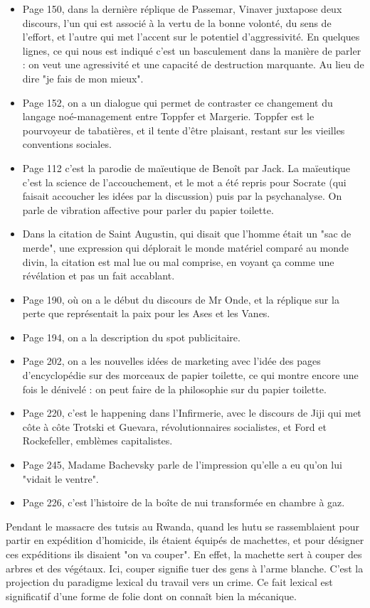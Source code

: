 \documentclass[a4paper,12pt]{book}
\begin{document}
\begin{itemize}
\item Page 150, dans la dernière réplique de Passemar, Vinaver juxtapose deux discours, l'un qui est associé à la vertu de la bonne volonté, du sens de l'effort, et l'autre qui met l'accent sur le potentiel d'aggressivité. En quelques lignes, ce qui nous est indiqué c'est un basculement dans la manière de parler : on veut une agressivité et une capacité de destruction marquante. Au lieu de dire "je fais de mon mieux".
\item Page 152, on a un dialogue qui permet de contraster ce changement du langage noé-management entre Toppfer et Margerie. Toppfer est le pourvoyeur de tabatières, et il tente d'être plaisant, restant sur les vieilles conventions sociales.
\item Page 112 c'est la parodie de maïeutique de Benoît par Jack. La maïeutique c'est la science de l'accouchement, et le mot a été repris pour Socrate (qui faisait accoucher les idées par la discussion) puis par la psychanalyse. On parle de vibration affective pour parler du papier toilette.
\item Dans la citation de Saint Augustin, qui disait que l'homme était un "sac de merde", une expression qui déplorait le monde matériel comparé au monde divin, la citation est mal lue ou mal comprise, en voyant ça comme une révélation et pas un fait accablant.
\item Page 190, où on a le début du discours de Mr Onde, et la réplique sur la perte que représentait la paix pour les Ases et les Vanes.
\item Page 194, on a la description du spot publicitaire.
\item Page 202, on a les nouvelles idées de marketing avec l'idée des pages d'encyclopédie sur des morceaux de papier toilette, ce qui montre encore une fois le dénivelé : on peut faire de la philosophie sur du papier toilette.
\item Page 220, c'est le happening dans l'Infirmerie, avec le discours de Jiji qui met côte à côte Trotski et Guevara, révolutionnaires socialistes, et Ford et Rockefeller, emblèmes capitalistes.
\item Page 245, Madame Bachevsky parle de l'impression qu'elle a eu qu'on lui "vidait le ventre".
\item Page 226, c'est l'histoire de la boîte de nui transformée en chambre à gaz.
\end{itemize}
Pendant le massacre des tutsis au Rwanda, quand les hutu se rassemblaient pour partir en expédition d'homicide, ils étaient équipés de machettes, et pour désigner ces expéditions ils disaient "on va couper". En effet, la machette sert à couper des arbres et des végétaux. Ici, couper signifie tuer des gens à l'arme blanche. C'est la projection du paradigme lexical du travail vers un crime. Ce fait lexical est significatif d'une forme de folie dont on connaît bien la mécanique.
\end{document}

